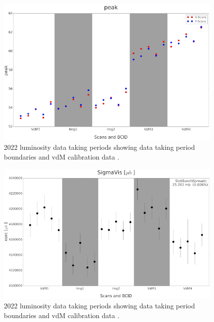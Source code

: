 \begin{figure}[!htp]
\centering
\includegraphics[width=1\textwidth]{ashish_thesis/2022_peak.png}
\caption[2018 CMS luminosity data taking periods.]{%
  2022 luminosity data taking periods showing data taking period boundaries and vdM calibration data  \cite{CERNLumiPublicResults}.
}
\label{fig:period_bound}
\end{figure}






\begin{figure}[!htp]
\centering
\includegraphics[width=1\textwidth]{ashish_thesis/2022_sigma_vis_btob_variation.png}
\caption[2018 CMS luminosity data taking periods.]{%
  2022 luminosity data taking periods showing data taking period boundaries and vdM calibration data  \cite{CERNLumiPublicResults}.
}
\label{fig:period_bound}
\end{figure}







